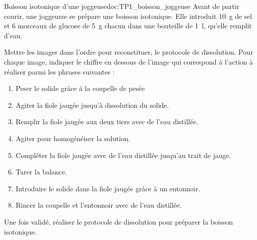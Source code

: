 
\begin{doc}{Boisson isotonique d'une joggeuse}{doc:TP1_boisson_joggeuse}
  Avant de partir courir, une joggeurse se prépare une boisson isotonique.
  Elle introduit \qty{10}{\g} de sel  et 6 morceaux de glucose  de \qty{5}{\g} chacun dans une bouteille de \qty{1}{\litre}, qu'elle remplit d'eau.
\end{doc}



\numeroQuestion
Mettre les images dans l'ordre pour reconstituer, le protocole de dissolution.
Pour chaque image, indiquer le chiffre en dessous de l'image qui correspond à l'action à réaliser parmi les phrases suivantes :
\begin{enumerate}
  \item Peser le solide grâce à la coupelle de pesée
  \item Agiter la fiole jaugée jusqu'à dissolution du solide.
  \item Remplir la fiole jaugée aux deux tiers avec de l'eau distillée.
  \item Agiter pour homogénéiser la solution.
  \item Compléter la fiole jaugée avec de l'eau distillée jusqu’au trait de jauge.
  \item Tarer la balance.
  \item Introduire le solide dans la fiole jaugée grâce à un entonnoir.
  \item Rincer la coupelle et l'entonnoir avec de l'eau distillée.
\end{enumerate}

\numeroQuestion Une fois validé, réaliser le protocole de dissolution pour préparer la boisson isotonique.
